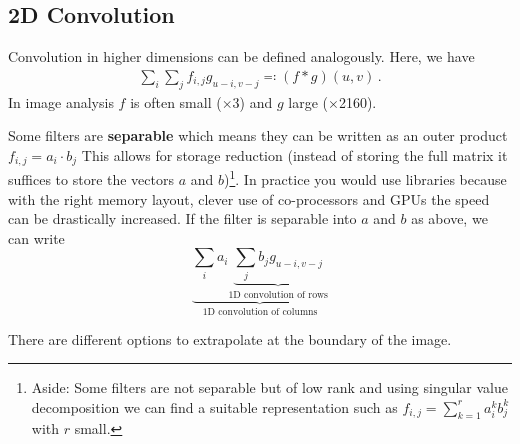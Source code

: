 \subsection*{2D Convolution}
Convolution in higher dimensions can be defined analogously. Here, we
have
\begin{gather*}
  \sum_i \sum_j f_{i,j}g_{u-i,v-j} \eqqcolon (f \ast g)(u,v)\,.
\end{gather*}
In image analysis $f$ is often small ($\times$3) and $g$ large
($\times$2160).

Some filters are \textbf{separable} which means they can be written as
an outer product $f_{i,j} = a_i \cdot b_j$ This allows for storage
reduction (instead of storing the full matrix it suffices to store the
vectors $a$ and $b$)\footnote{Aside: Some filters are not separable
  but of low rank and using singular value decomposition we can find a
  suitable representation such as $f_{i,j} = \sum_{k=1}^r a_i^k b_j^k$
  with $r$ small.}. In practice you would use libraries because with
the right memory layout, clever use of co-processors and GPUs the
speed can be drastically increased. If the filter is separable into
$a$ and $b$ as above, we can write
\begin{equation*}
  \underbrace{
    \sum_i a_i \underbrace{
      \sum_j b_j g_{u-i,v-j}
    }_{\text{1D convolution of rows}}
  }_{\text{1D convolution of columns}}
\end{equation*}

There are different options to extrapolate at the boundary of the
image.


